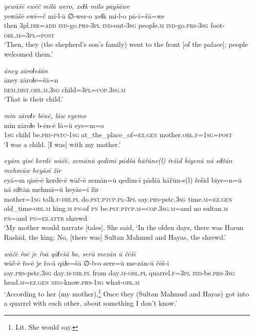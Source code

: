 \ea \label{KŠ.94}
\textit{yewāšē ewēč milā wero, xeɫk milo pāyšāwe} \\ 
\gll yewāšē ewē=č mi-l-ā ∅-wer-o xeɫk mi-l-o pā-ī=šā=we \\ 
 then 3pl\textsc{.dir}\textsc{=add} \textsc{ind-}go\textsc{.prs}\textsc{-3pl} \textsc{ind-}out\textsc{-3sg} people\textsc{.m} \textsc{ind-}go\textsc{.prs}\textsc{-3sg} foot\textsc{-obl}\textsc{.m}\textsc{=3pl}\textsc{=\textsc{post}} \\ 
\glt `Then, they (the shepherd’s son’s family) went to the front [of the palace]; people welcomed them.'
\z 
 
\ea \label{KŠ.102}
\textit{āney zāroɫešān} \\ 
\gll āney zāroɫe=šā=n \\ 
 \textsc{dem.dist}\textsc{.obl}\textsc{.m}\textsc{.3sg} child\textsc{=3pl}\textsc{=cop}\textsc{.3sg}\textsc{.m} \\ 
\glt `That is their child.'
\z 
 
\ea \label{ŽH.1}
\textit{min zāroɫe bēnē, lāw eyemo} \\ 
\gll min zāroɫe b-ēn-ē lā=ū eye=m=o \\ 
 \textsc{1sg} child be\textsc{.prs}\textsc{-pstc}\textsc{-1sg} at\_the\_place\_of\textsc{=ez}\textsc{.gen} mother\textsc{.obl}\textsc{\textsc{.f}}\textsc{=1sg}\textsc{=\textsc{post}} \\ 
\glt `I was a child. [I was] with my mother.'
\z 
 
\ea \label{ŽH.2}
\textit{eyām qisē kerdē wāčē, zemānū qedīmī pādšā hāřūne(l) řešīd bīyenū nā siɫtān mehmūw heyāsī žīr} \\ 
\gll eyā=m qisē-ē kerdē-ē wāč-ē zemān=ū qedīm-ī pādšā hāřūn-e(l) řešīd bīye=n=ū nā siɫtān mehmū=ū heyās=ī žīr \\ 
 mother\textsc{=1sg} talk\textsc{\textsc{.f}}\textsc{-dir}\textsc{.pl} do\textsc{.pst}\textsc{.ptcp}\textsc{.pl}\textsc{-3pl} say\textsc{.prs-}pstc\textsc{.3sg} time\textsc{.m}\textsc{=ez}\textsc{.gen} old\_time\textsc{-obl}\textsc{.m} king\textsc{.m} \textsc{pn}-of \textsc{pn} be\textsc{.pst}\textsc{.ptcp}\textsc{.m}\textsc{=cop}\textsc{.3sg}\textsc{.m}=and no sultan\textsc{.m} \textsc{pn}=and \textsc{pn}\textsc{=ez}.\textsc{attr} shrewd \\ 
\glt `My mother would narrate [tales]. She said, ‘In the olden days, there was Harun Rashid, the king. No, [there was] Sultan Mahmud and Hayas, the shrewd.'
\z 
 
\ea \label{ŽH.3}
\textit{wāčē řoē je řoā qāɫešā bo, serū mezān ū čēšī} \\ 
\gll wāč-ē řo-ē je řo-ā qāɫe=šā ∅-b-o sere=ū me-zān-ū čēš-ī \\ 
 say\textsc{.prs-}pstc\textsc{.3sg} day\textsc{.m}\textsc{-dir}\textsc{.pl} from day\textsc{.m}\textsc{-obl}\textsc{.pl} quarrel\textsc{\textsc{.f}}\textsc{=3pl} \textsc{ind-}be\textsc{.prs}\textsc{-3sg} head\textsc{.m}\textsc{=ez}\textsc{.gen} \textsc{neg-}know\textsc{.prs}\textsc{-1sg} what\textsc{-obl}\textsc{.m} \\ 
\glt `According to her (my mother),\footnote{Lit. She would say.}  Once they (Sultan Mahmud and Hayas) got into a quarrel with each other, about something I don’t know.'
\z 
 
